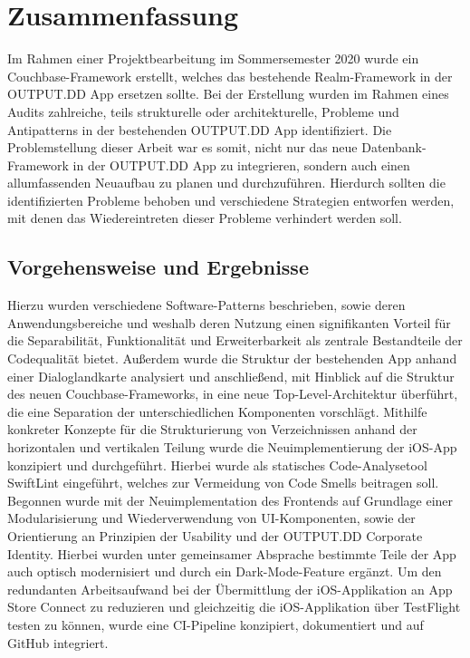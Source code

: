 \chapter{Zusammenfassung}\label{ch:zusammenfassung}

Im Rahmen einer Projektbearbeitung im Sommersemester 2020 wurde ein Couchbase-Framework erstellt, welches das bestehende Realm-Framework in der OUTPUT.DD App ersetzen sollte. Bei der Erstellung wurden im Rahmen eines Audits zahlreiche, teils strukturelle oder architekturelle, Probleme und Antipatterns in der bestehenden OUTPUT.DD App identifiziert. Die Problemstellung dieser Arbeit war es somit, nicht nur das neue Datenbank-Framework in der OUTPUT.DD App zu integrieren, sondern auch einen allumfassenden Neuaufbau zu planen und durchzuführen. Hierdurch sollten die identifizierten Probleme behoben und verschiedene Strategien entworfen werden, mit denen das Wiedereintreten dieser Probleme verhindert werden soll.

\section{Vorgehensweise und Ergebnisse}

\noindent Hierzu wurden verschiedene Software-Patterns beschrieben, sowie deren Anwendungsbereiche und weshalb deren Nutzung einen signifikanten Vorteil für die Separabilität, Funktionalität und Erweiterbarkeit als zentrale Bestandteile der Codequalität bietet. Außerdem wurde die Struktur der bestehenden App anhand einer Dialoglandkarte analysiert und anschließend, mit Hinblick auf die Struktur des neuen Couchbase-Frameworks, in eine neue Top-Level-Architektur überführt, die eine Separation der unterschiedlichen Komponenten vorschlägt. Mithilfe konkreter Konzepte für die Strukturierung von Verzeichnissen anhand der horizontalen und vertikalen Teilung wurde die Neuimplementierung der iOS-App konzipiert und durchgeführt. Hierbei wurde als statisches Code-Analysetool SwiftLint eingeführt, welches zur Vermeidung von Code Smells beitragen soll. Begonnen wurde mit der Neuimplementation des Frontends auf Grundlage einer Modularisierung und Wiederverwendung von UI-Komponenten, sowie der Orientierung an Prinzipien der Usability und der OUTPUT.DD Corporate Identity. Hierbei wurden unter gemeinsamer Absprache bestimmte Teile der App auch optisch modernisiert und durch ein Dark-Mode-Feature ergänzt. Um den redundanten Arbeitsaufwand bei der Übermittlung der iOS-Applikation an App Store Connect zu reduzieren und gleichzeitig die iOS-Applikation über TestFlight testen zu können, wurde eine CI-Pipeline konzipiert, dokumentiert und auf GitHub integriert.

